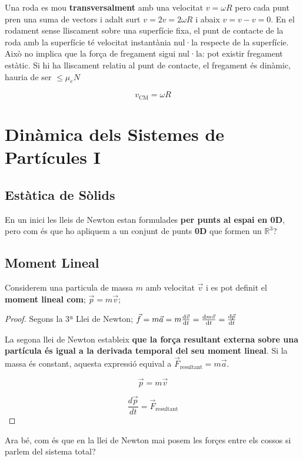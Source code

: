 \documentclass[12pt]{article}
\newcommand{\R}{\mathbb{R}}
\begin{document}
Una roda es mou \textbf{transversalment} amb una velocitat $v = \omega R$ pero cada punt pren una suma de vectors i adalt surt $v = 2v = 2\omega R$ i abaix $v = v-v = 0$. En el rodament sense lliscament sobre una superfície fixa, el punt de contacte de la roda amb la superfície té velocitat instantània nul·la respecte de la superfície. Això no implica que la força de fregament sigui nul·la: pot existir fregament estàtic. Si hi ha lliscament relatiu al punt de contacte, el fregament és dinàmic, hauria de ser $\leq \mu_e N$

\[
v_{\mathrm{CM}}=\omega R
\]

\section{Dinàmica dels Sistemes de Partícules I}

\subsection{Estàtica de Sòlids}

En un inici les lleis de Newton estan formulades \textbf{per punts al espai en 0D}, pero com és que ho apliquem a un conjunt de punts \textbf{0D} que formen un $\R^3$?

\subsection{Moment Lineal}

Considerem una particula de massa $m$ amb velocitat $\vec{v}$ i es pot definit el \textbf{moment lineal com}; $\vec{p} = m\vec{v}$;

\begin{proof}
    Segons la 3ª Llei de Newton; $\vec{f} = m\vec{a} = m \dv{\vec{v}}{t} = \dv{m\vec{v}}{t} = \dv{\vec{p}}{t} $

    La segona llei de Newton estableix \textbf{que la força resultant externa sobre una partícula és igual a la derivada temporal del seu moment lineal}. Si la massa és constant, aquesta expressió equival a \(\vec F_{\mathrm{resultant}}=m\vec a\).

    \[
    \vec p=m\vec v
    \]

    \[
    \frac{d\vec p}{dt}=\vec F_{\mathrm{resultant}}
    \]
\end{proof}

Ara bé, com és que en la llei de Newton mai posem les forçes entre els cossos si parlem del sistema total?
\end{document}
